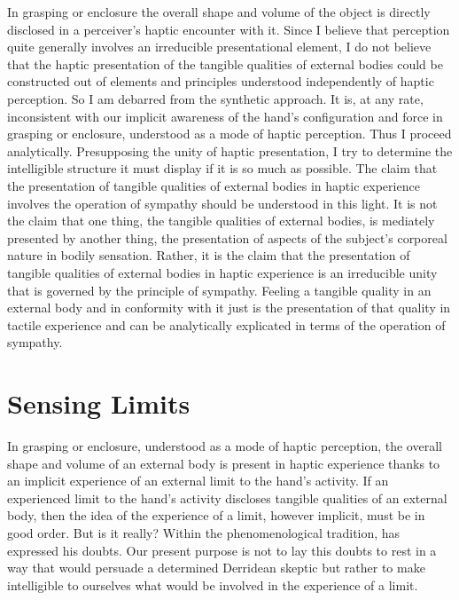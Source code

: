 In grasping or enclosure the overall shape and volume of the object is directly disclosed in a perceiver's haptic encounter with it. Since I believe that perception quite generally involves an irreducible presentational element, I do not believe that the haptic presentation of the tangible qualities of external bodies could be constructed out of elements and principles understood independently of haptic perception. So I am debarred from the synthetic approach. It is, at any rate, inconsistent with our implicit awareness of the hand's configuration and force in grasping or enclosure, understood as a mode of haptic perception. Thus I proceed analytically. Presupposing the unity of haptic presentation, I try to determine the intelligible structure it must display if it is so much as possible. The claim that the presentation of tangible qualities of external bodies in haptic experience involves the operation of sympathy should be understood in this light. It is not the claim that one thing, the tangible qualities of external bodies, is mediately presented by another thing, the presentation of aspects of the subject's corporeal nature in bodily sensation. Rather, it is the claim that the presentation of tangible qualities of external bodies in haptic experience is an irreducible unity that is governed by the principle of sympathy. Feeling a tangible quality in an external body and in conformity with it just is the presentation of that quality in tactile experience and can be analytically explicated in terms of the operation of sympathy.


\section{Sensing Limits} %
\label{sec:sensing_limits}

In grasping or enclosure, understood as a mode of haptic perception, the overall shape and volume of an external body is present in haptic experience thanks to an implicit experience of an external limit to the hand's activity. If an experienced limit to the hand's activity discloses tangible qualities of an external body, then the idea of the experience of a limit, however implicit, must be in good order. But is it really? Within the phenomenological tradition, \citet{Derrida:2005aa} has expressed his doubts. Our present purpose is not to lay this doubts to rest in a way that would persuade a determined Derridean skeptic but rather to make intelligible to ourselves what would be involved in the experience of a limit.

